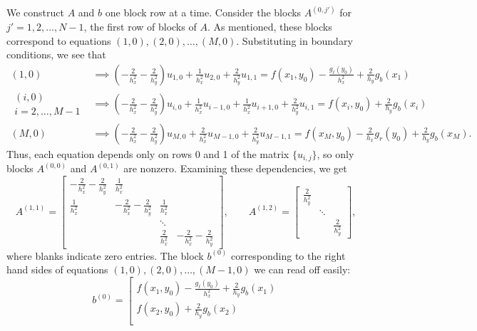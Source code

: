 \documentclass{homework}
\begin{document}
\begin{alphaparts}
		We construct $A$ and $b$ one block row at a time. Consider the blocks $A^{(0,j')}$ for $j'=1,2,\dots, N-1$, the first row of blocks of $A$. As mentioned, these blocks correspond to equations $(1,0),(2,0), \dots, (M,0)$. Substituting in boundary conditions, we see that
		\begin{align*}
			(1,0) &\implies \left(-\frac{2}{h_x^2}-\frac{2}{h_y^2}\right)u_{1,0} + \frac{1}{h_x^2}u_{2,0} + \frac{2}{h_y^2}u_{1,1} = f(x_1,y_0) - \frac{g_\ell(y_0)}{h_x^2} + \frac{2}{h_y}g_b(x_1) \\
			\substack{(i,0) \\ i=2,\dots,M-1} &\implies \left(-\frac{2}{h_x^2}-\frac{2}{h_y^2}\right)u_{i,0} + \frac{1}{h_x^2}u_{i-1,0} + \frac{1}{h_x^2}u_{i+1,0} + \frac{2}{h_y^2}u_{i,1} = f(x_i,y_0) + \frac{2}{h_y}g_b(x_i) \\
			(M,0) &\implies \left(-\frac{2}{h_x^2}-\frac{2}{h_y^2}\right)u_{M,0} + \frac{2}{h_x^2}u_{M-1,0} + \frac{2}{h_y^2}u_{M-1,1} = f(x_{M}, y_0) - \frac{2}{h_x}g_r(y_0) + \frac{2}{h_y}g_b(x_{M}).
		\end{align*}
		Thus, each equation depends only on rows 0 and 1 of the matrix $\{u_{i,j}\}$, so only blocks $A^{(0,0)}$ and $A^{(0,1)}$ are nonzero. Examining these dependencies, we get
		\begin{equation*}
			A^{(1,1)} = \left[\begin{matrix}
				-\frac{2}{h_x^2}-\frac{2}{h_y^2} & \frac{1}{h_x^2} \\
				\frac{1}{h_x^2} & -\frac{2}{h_x^2}-\frac{2}{h_y^2} & \frac{1}{h_x^2} \\
				& & \ddots \\
				& & \frac{2}{h_x^2} & -\frac{2}{h_x^2}-\frac{2}{h_y^2} 
			\end{matrix}\right], \qquad
			A^{(1,2)} = \left[\begin{matrix}\frac{2}{h_y^2} \\ & \ddots \\ & & \frac{2}{h_y^2} \end{matrix}\right],
		\end{equation*}
		where blanks indicate zero entries. The block $b^{(0)}$ corresponding to the right hand sides of equations $(1,0),(2,0), \dots, (M-1,0)$ we can read off easily:
		\begin{equation*}
			b^{(0)} = \left[\begin{matrix}
				f(x_1,y_0) - \frac{g_\ell(y_0)}{h_x^2} + \frac{2}{h_y}g_b(x_1) \\
				f(x_2,y_0) + \frac{2}{h_y}g_b(x_2) \\

\end{matrix}
\end{equation*}
\end{alphaparts}
\end{document}

